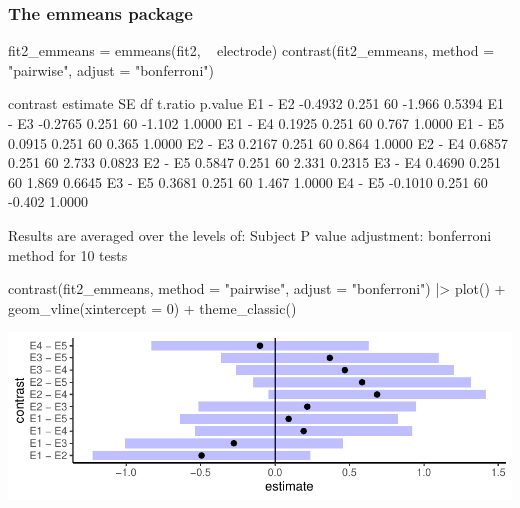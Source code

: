 \documentclass[a4paper]{article}\usepackage[]{graphicx}\usepackage[]{xcolor}
\makeatletter
\def\maxwidth{ %
  \ifdim\Gin@nat@width>\linewidth
    \linewidth
  \else
    \Gin@nat@width
  \fi
}
\makeatother
\begin{document}
\subsubsection{The emmeans package}
\begin{Schunk}
\begin{Sinput}
fit2_emmeans = emmeans(fit2, ~ electrode)
contrast(fit2_emmeans, method = "pairwise", adjust = "bonferroni")
\end{Sinput}
\begin{Soutput}
 contrast estimate    SE df t.ratio p.value
 E1 - E2   -0.4932 0.251 60  -1.966  0.5394
 E1 - E3   -0.2765 0.251 60  -1.102  1.0000
 E1 - E4    0.1925 0.251 60   0.767  1.0000
 E1 - E5    0.0915 0.251 60   0.365  1.0000
 E2 - E3    0.2167 0.251 60   0.864  1.0000
 E2 - E4    0.6857 0.251 60   2.733  0.0823
 E2 - E5    0.5847 0.251 60   2.331  0.2315
 E3 - E4    0.4690 0.251 60   1.869  0.6645
 E3 - E5    0.3681 0.251 60   1.467  1.0000
 E4 - E5   -0.1010 0.251 60  -0.402  1.0000

Results are averaged over the levels of: Subject 
P value adjustment: bonferroni method for 10 tests 
\end{Soutput}
\begin{Sinput}
contrast(fit2_emmeans, method = "pairwise", adjust = "bonferroni") |> 
  plot() + geom_vline(xintercept = 0) +
  theme_classic()
\end{Sinput}


{\centering \includegraphics[width=\maxwidth]{figure/listings-unnamed-chunk-293-1} 

}

\end{Schunk}
\end{document}
